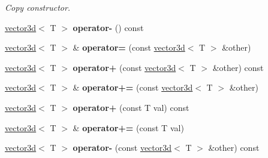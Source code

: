 \begin{DoxyCompactItemize}
\begin{DoxyCompactList}\small\item\em Copy constructor. \end{DoxyCompactList}\item 
\hyperlink{classirr_1_1core_1_1vector3d}{vector3d}$<$ T $>$ {\bfseries operator-\/} () const \hypertarget{classirr_1_1core_1_1vector3d_acc66a64d3e7ee0b722d155c4e987ecbe}{}\label{classirr_1_1core_1_1vector3d_acc66a64d3e7ee0b722d155c4e987ecbe}

\item 
\hyperlink{classirr_1_1core_1_1vector3d}{vector3d}$<$ T $>$ \& {\bfseries operator=} (const \hyperlink{classirr_1_1core_1_1vector3d}{vector3d}$<$ T $>$ \&other)\hypertarget{classirr_1_1core_1_1vector3d_afaaaf1d22c44ac50d03026cbfc794c42}{}\label{classirr_1_1core_1_1vector3d_afaaaf1d22c44ac50d03026cbfc794c42}

\item 
\hyperlink{classirr_1_1core_1_1vector3d}{vector3d}$<$ T $>$ {\bfseries operator+} (const \hyperlink{classirr_1_1core_1_1vector3d}{vector3d}$<$ T $>$ \&other) const \hypertarget{classirr_1_1core_1_1vector3d_a19d8592169d08d461a80d0e3c5a27b7f}{}\label{classirr_1_1core_1_1vector3d_a19d8592169d08d461a80d0e3c5a27b7f}

\item 
\hyperlink{classirr_1_1core_1_1vector3d}{vector3d}$<$ T $>$ \& {\bfseries operator+=} (const \hyperlink{classirr_1_1core_1_1vector3d}{vector3d}$<$ T $>$ \&other)\hypertarget{classirr_1_1core_1_1vector3d_a37360dbe7e5542e1cd3cdb768f250922}{}\label{classirr_1_1core_1_1vector3d_a37360dbe7e5542e1cd3cdb768f250922}

\item 
\hyperlink{classirr_1_1core_1_1vector3d}{vector3d}$<$ T $>$ {\bfseries operator+} (const T val) const \hypertarget{classirr_1_1core_1_1vector3d_a676c089849a119d557e3fd32eb47d2a8}{}\label{classirr_1_1core_1_1vector3d_a676c089849a119d557e3fd32eb47d2a8}

\item 
\hyperlink{classirr_1_1core_1_1vector3d}{vector3d}$<$ T $>$ \& {\bfseries operator+=} (const T val)\hypertarget{classirr_1_1core_1_1vector3d_a90dd07738795890b90fbf4b133cd7930}{}\label{classirr_1_1core_1_1vector3d_a90dd07738795890b90fbf4b133cd7930}

\item 
\hyperlink{classirr_1_1core_1_1vector3d}{vector3d}$<$ T $>$ {\bfseries operator-\/} (const \hyperlink{classirr_1_1core_1_1vector3d}{vector3d}$<$ T $>$ \&other) const \hypertarget{classirr_1_1core_1_1vector3d_ae17fdfbc02988aff60dfde5456c9032d}{}\label{classirr_1_1core_1_1vector3d_ae17fdfbc02988aff60dfde5456c9032d}


\end{DoxyCompactItemize}
